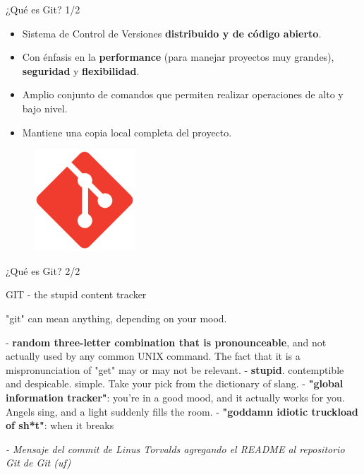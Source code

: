 \begin{frame}{¿Qué es Git? 1/2}

	\begin{block}{}
 \begin{itemize}
     	\item Sistema de Control de Versiones \textbf{distribuido y de código abierto}.
  
        \item Con énfasis en la \textbf{performance} (para manejar proyectos muy grandes), \textbf{seguridad} y \textbf{flexibilidad}.
        
        \item Amplio conjunto de comandos que permiten realizar operaciones de alto y bajo nivel.

        \item Mantiene una copia local completa del proyecto.
 \end{itemize}

	\end{block}

    \begin{figure}[ht]
        \begin{center}
            \includegraphics[height=1.5in]{images/logo-git.pdf}
        \end{center}
    \end{figure}
\end{frame}

\begin{frame}{¿Qué es Git? 2/2}
    \begin{center}
        \begin{block}{GIT - the stupid content tracker}

            "git" can mean anything, depending on your mood.
            
             - \textbf{random three-letter combination that is pronounceable}, and not actually used by any common UNIX command.  The fact that it is a mispronunciation of "get" may or may not be relevant.\newline
             - \textbf{stupid}. contemptible and despicable. simple. Take your pick from the dictionary of slang.\newline
             - \textbf{"global information tracker"}: you're in a good mood, and it actually works for you. Angels sing, and a light suddenly fills the room. \newline
             - \textbf{"goddamn idiotic truckload of sh*t"}: when it breaks
        \end{block}
    \end{center}
    \pause
    \textit{ - Mensaje del commit de Linus Torvalds agregando el README al repositorio Git de Git (uf)}
    
\end{frame}

